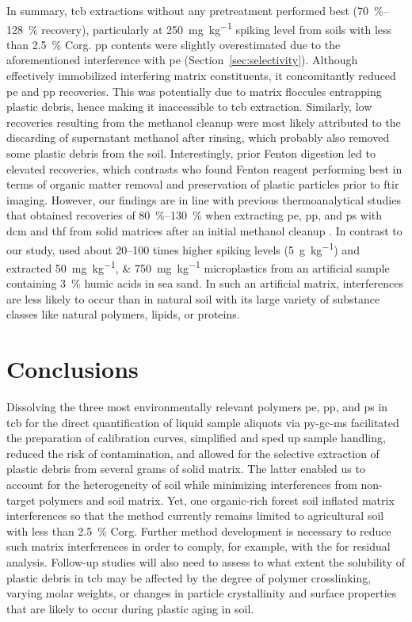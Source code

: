 In summary, \ac{tcb} extractions without any pretreatment performed best (\SIrange{70}{128}{\percent} recovery), particularly at \SI{250}{\milli\gram\per\kilo\gram} spiking level from soils with less than \SI{2.5}{\percent} \ac{Corg}. \Ac{pp} contents were slightly overestimated due to the aforementioned interference with \ac{pe} (Section~\ref{sec:selectivity}). Although  effectively immobilized interfering matrix constituents, it concomitantly reduced \ac{pe} and \ac{pp} recoveries. This was potentially due to matrix floccules entrapping plastic debris, hence making it inaccessible to \ac{tcb} extraction. Similarly, low recoveries resulting from the methanol cleanup were most likely attributed to the discarding of supernatant methanol after rinsing, which probably also removed some plastic debris from the soil. Interestingly, prior Fenton digestion led to elevated recoveries, which contrasts \citet{HurleyValidation2018} who found Fenton reagent performing best in terms of organic matter removal and preservation of plastic particles prior to \ac{ftir} imaging. However, our findings are in line with previous thermoanalytical studies that obtained recoveries of \SIrange{80}{130}{\percent} when extracting \ac{pe}, \ac{pp}, and \ac{ps} with \ac{dcm} and \ac{thf} from solid matrices after an initial methanol cleanup \citep{FullerProcedure2016,DierkesQuantification2019}. In contrast to our study, \citet{FullerProcedure2016} used about \numrange{20}{100} times higher spiking levels (\SI{5}{\gram\per\kilo\gram}) and \citet{DierkesQuantification2019} extracted \SIlist{50;750}{\milli\gram\per\kilo\gram} microplastics from an artificial sample containing \SI{3}{\percent} humic acids in sea sand. In such an artificial matrix, interferences are less likely to occur than in natural soil with its large variety of substance classes like natural polymers, lipids, or proteins.

\section{Conclusions}

Dissolving the three most environmentally relevant polymers \ac{pe}, \ac{pp}, and \ac{ps} in \ac{tcb} for the direct quantification of liquid sample aliquots via \ac{py-gc-ms} facilitated the preparation of calibration curves, simplified and sped up sample handling, reduced the risk of contamination, and allowed for the selective extraction of plastic debris from several grams of solid matrix.
The latter enabled us to account for the heterogeneity of soil while minimizing interferences from non-target polymers and soil matrix. Yet, one organic-rich forest soil inflated matrix interferences so that the method currently remains limited to agricultural soil with less than \SI{2.5}{\percent} \ac{Corg}. Further method development is necessary to reduce such matrix interferences in order to comply, for example, with the \citet{EUDecision2002/657/ECCommission2002} for residual analysis. Follow-up studies will also need to assess to what extent the solubility of plastic debris in \ac{tcb} may be affected by the degree of polymer crosslinking, varying molar weights, or changes in particle crystallinity and surface properties that are likely to occur during plastic aging in soil.

